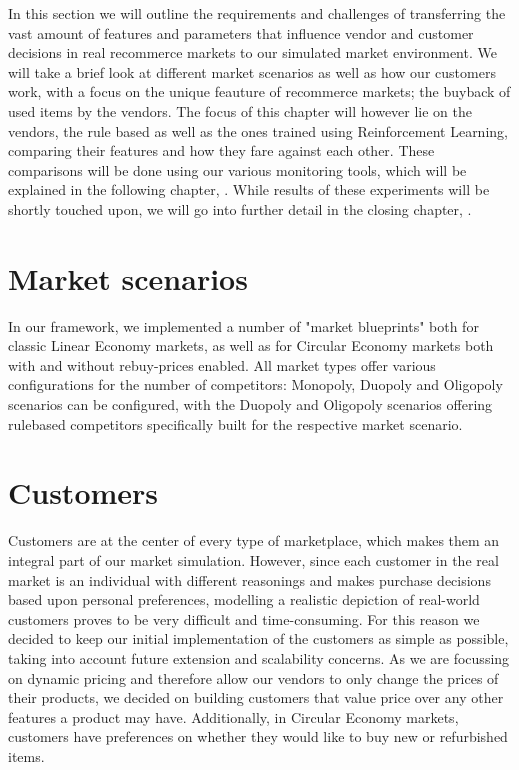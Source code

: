 \begin{jointwork}
	In this section we will outline the requirements and challenges of transferring the vast amount of features and parameters that influence vendor and customer decisions in real recommerce markets to our simulated market environment. We will take a brief look at different market scenarios as well as how our customers work, with a focus on the unique feauture of recommerce markets; the buyback of used items by the vendors. The focus of this chapter will however lie on the vendors, the rule based as well as the ones trained using Reinforcement Learning, comparing their features and how they fare against each other. These comparisons will be done using our various monitoring tools, which will be explained in the following chapter, . While results of these experiments will be shortly touched upon, we will go into further detail in the closing chapter, .
\end{jointwork}

\section{Market scenarios} \label{sec:MarketScenarios}

In our framework, we implemented a number of "market blueprints" both for classic Linear Economy markets, as well as for Circular Economy markets both with and without rebuy-prices enabled. All market types offer various configurations for the number of competitors: Monopoly, Duopoly and Oligopoly scenarios can be configured, with the Duopoly and Oligopoly scenarios offering rulebased competitors specifically built for the respective market scenario.

\section{Customers}

Customers are at the center of every type of marketplace, which makes them an integral part of our market simulation. However, since each customer in the real market is an individual with different reasonings and makes purchase decisions based upon personal preferences, modelling a realistic depiction of real-world customers proves to be very difficult and time-consuming. For this reason we decided to keep our initial implementation of the customers as simple as possible, taking into account future extension and scalability concerns. As we are focussing on dynamic pricing and therefore allow our vendors to only change the prices of their products, we decided on building customers that value price over any other features a product may have. Additionally, in Circular Economy markets, customers have preferences on whether they would like to buy new or refurbished items.

